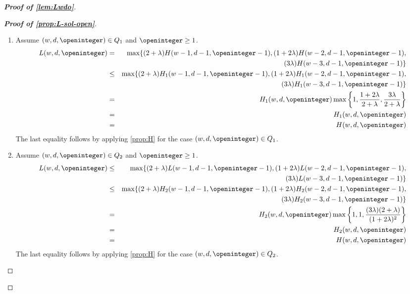 \begin{proof}[\textbf{Proof of \cref{lem:Lwdo}}]
\begin{proof}[\textbf{Proof of \cref{prop:L-sol-open}}]
\begin{enumerate}[label=\textbf{Case \arabic*:}, itemindent=*, leftmargin=0em]
\item Assume $(w, d, \openinteger)\in Q_1$ and $\openinteger \ge 1$.
\begin{eqnarray*}
L(w, d, \openinteger) & = & \max\{(2+\lambda)H(w-1, d-1, \openinteger-1), (1+2\lambda)H(w-2, d-1, \openinteger-1), \\
& & (3\lambda)H(w-3, d-1, \openinteger-1)\}\\
& \le & \max\{(2+\lambda)H_1(w-1, d-1, \openinteger-1), (1+2\lambda)H_1(w-2, d-1, \openinteger-1), \\
& & (3\lambda)H_1(w-3, d-1, \openinteger-1)\}\\
& = & H_1(w, d, \openinteger)\max\left\{1, \frac{1+2\lambda}{2+\lambda}, \frac{3\lambda}{2+\lambda}\right\} \\
& = & H_1(w, d, \openinteger)\\
& = & H(w, d, \openinteger)
\end{eqnarray*}
The last equality follows by applying \cref{prop:H} for the case $(w, d,\openinteger)\in Q_1$.

\item Assume $(w, d, \openinteger)\in Q_2$ and $\openinteger \ge 1$.
\begin{eqnarray*}
L(w, d, \openinteger) & \leq & \max\{(2+\lambda)L(w-1, d-1, \openinteger-1), (1+2\lambda)L(w-2, d-1, \openinteger-1), \\
& & (3\lambda)L(w-3, d-1, \openinteger-1)\}\\
& \le & \max\{(2+\lambda)H_2(w-1, d-1, \openinteger-1), (1+2\lambda)H_2(w-2, d-1, \openinteger-1), \\
& & (3\lambda)H_2(w-3, d-1, \openinteger-1)\}\\
& = & H_2(w, d, \openinteger)\max\left\{1, 1, \frac{(3\lambda)(2+\lambda)}{(1+2\lambda)^2} \right\}\\
& = & H_2(w, d, \openinteger)\\
& = & H(w, d, \openinteger)\\
\end{eqnarray*}
The last equality follows by applying \cref{prop:H} for the case $(w, d,\openinteger)\in Q_2$.


\end{enumerate}
\end{proof}
\end{proof}
